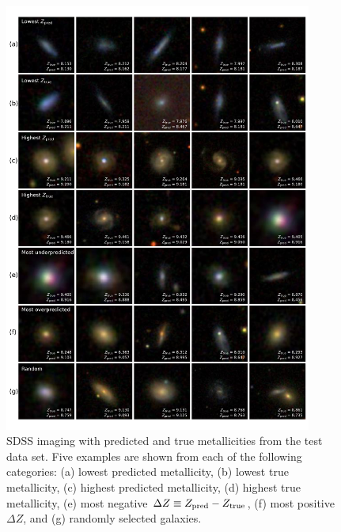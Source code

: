 \documentclass[fleqn,usenatbib]{mnras}
\begin{document}
\begin{figure}
	\includegraphics[width=0.9\textwidth]{01-prediction_examples.pdf}
	\caption{\label{fig:examples}
		SDSS imaging with predicted and true metallicities from the test data set. 
		Five examples are shown from each of the following categories: (a) lowest predicted metallicity, (b) lowest true metallicity, (c) highest predicted metallicity, (d) highest true metallicity, (e) most negative $\Delta Z \equiv Z_{\rm pred} - Z_{\rm true}$, (f) most positive $\Delta Z$, and (g) randomly selected galaxies.}
\end{figure}
\end{document}
